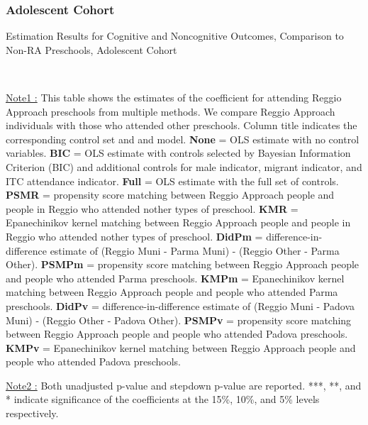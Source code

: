 \subsubsection{Adolescent Cohort}
\begin{table}[H] \caption{Estimation Results for Cognitive and Noncognitive Outcomes, Comparison to Non-RA Preschools, Adolescent Cohort} \label{ols-CN-adol-reg-reli}
\scalebox{0.6}{}
\vspace{1ex} \\
\footnotesize\raggedright{\underline{Note1 :} This table shows the estimates of the coefficient for attending Reggio Approach preschools from multiple methods. We compare Reggio Approach individuals with those who attended other preschools. Column title indicates the corresponding control set and and model. \textbf{None} = OLS estimate with no control variables. \textbf{BIC} = OLS estimate with controls selected by Bayesian Information Criterion (BIC) and additional controls for male indicator, migrant indicator, and ITC attendance indicator. \textbf{Full} = OLS estimate with the full set of controls. \textbf{PSMR} =  propensity score matching between Reggio Approach people and people in Reggio who attended nother types of preschool. \textbf{KMR} = Epanechinikov kernel matching between Reggio Approach people and people in Reggio who attended nother types of preschool. \textbf{DidPm} = difference-in-difference estimate of (Reggio Muni - Parma Muni) - (Reggio Other - Parma Other). \textbf{PSMPm} = propensity score matching between Reggio Approach people and people who attended Parma preschools. \textbf{KMPm} = Epanechinikov kernel matching between Reggio Approach people and people who attended Parma preschools. \textbf{DidPv} = difference-in-difference estimate of (Reggio Muni - Padova Muni) - (Reggio Other - Padova Other). \textbf{PSMPv} = propensity score matching between Reggio Approach people and people who attended Padova preschools. \textbf{KMPv} = Epanechinikov kernel matching between Reggio Approach people and people who attended Padova preschools.} 

\footnotesize\raggedright{\underline{Note2 :} Both unadjusted p-value and stepdown p-value are reported. ***, **, and * indicate significance of the coefficients at the 15\%, 10\%, and 5\% levels respectively.}
\end{table}


